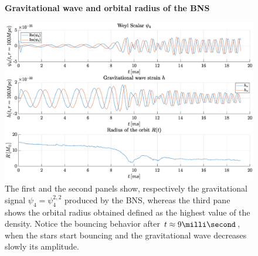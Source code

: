 \begin{figure}[H]
\centering
    \textbf{Gravitational wave and orbital radius of the BNS}\par\medskip
\centering   
\includegraphics[width=1\textwidth]{numerical_evolution/gw_r_bns.eps}
\caption{The first and the second panels show, respectively the gravitational signal $\psi_4=\psi_4 ^{2,2}$ produced by the BNS, whereas the third pane shows the orbital radius obtained defined as the highest value of the density. Notice the bouncing behavior after $t \approx 9 \milli \second$, when the stars start bouncing and the gravitational wave decreases slowly its amplitude.}
\label{gw_r_bns}
\end{figure}

